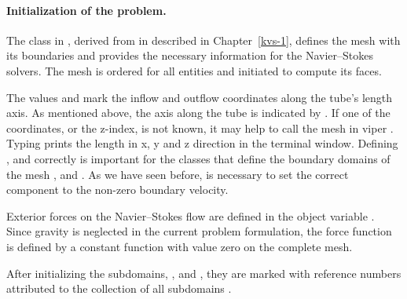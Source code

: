 \paragraph{Initialization of the problem.}
The  class in , derived from 
in  described in Chapter~\ref{kvs-1}, 
defines the mesh with its boundaries and provides the
necessary information for the Navier--Stokes solvers. The mesh is
ordered for all entities and initiated to compute its faces.

The values  and  mark the inflow and outflow
coordinates along the tube's length axis. As mentioned above, the axis
along the tube is indicated by . If one of the
coordinates, or the z-index, is not known, it may help to call the
mesh in viper . Typing  prints the
length in x, y and z direction in the terminal window. Defining
,  and  correctly is important
for the classes that define the boundary domains of the mesh
,  and . As we have seen before,
 is necessary to set the correct component to the
non-zero boundary velocity.

Exterior forces on the Navier--Stokes flow are defined in the object
variable . Since gravity is neglected in the current problem
formulation, the force function  is defined by a constant
function  with value zero on the complete mesh.

After initializing the subdomains, , 
and , they are marked with reference numbers attributed
to the collection of all subdomains .

